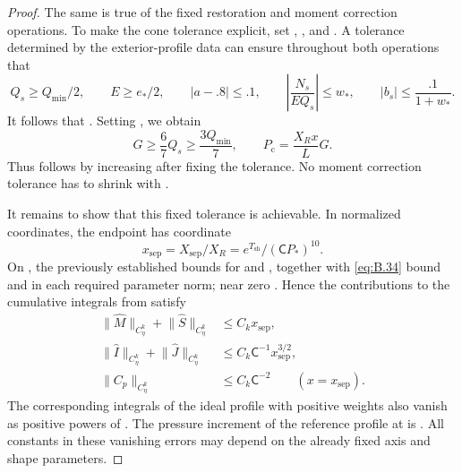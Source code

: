 \begin{proof}
The same is true of the fixed restoration and moment correction operations. To make
the cone tolerance explicit, set
,
, and
. A tolerance determined by the exterior-profile data can ensure
throughout both operations that
\begin{equation}
  Q_s\geq Q_{\min}/2,\qquad
  E\geq e_*/2,\qquad
  |a-.8|\leq.1,\qquad
  \left|\frac{N_s}{EQ_s}\right|\leq w_*,\qquad
  |b_s|\leq\frac{.1}{1+w_*}.
\tag{B.36}\label{eq:B.36}
\end{equation}
It follows that . Setting
, we obtain
\begin{equation}
  G\geq\frac67Q_s\geq\frac{3Q_{\min}}7,
  \qquad
  P_{\mathrm c}=\frac{X_Rx}{L}G.
\tag{B.37}\label{eq:B.37}
\end{equation}
Thus  follows by increasing  after fixing the tolerance. No moment correction
tolerance has to shrink with .

It remains to show that this fixed tolerance is achievable. In normalized coordinates, the
endpoint  has coordinate
\begin{equation}
  x_{\mathrm{sep}}=X_{\mathrm{sep}}/X_R=e^{T_{\mathrm{sh}}}/(\mathsf C P_*)^{10}.
\tag{B.38}\label{eq:B.38}
\end{equation}
On , the previously established bounds for
 and
, together with \eqref{eq:B.34} bound
 and  in each required parameter norm; near zero
. Hence the contributions to the cumulative integrals from
 satisfy
\begin{equation}
\begin{aligned}
  \lVert\widehat M\rVert_{C_\eta^k}+\lVert\widehat S\rVert_{C_\eta^k}
    &\leq C_kx_{\mathrm{sep}},\\
  \lVert\widehat I\rVert_{C_\eta^k}+\lVert\widehat J\rVert_{C_\eta^k}
    &\leq C_k\mathsf C^{-1}x_{\mathrm{sep}}^{3/2},\\
  \lVert C_p\rVert_{C_\eta^k}
    &\leq C_k\mathsf C^{-2}\qquad(x=x_{\mathrm{sep}}).
\end{aligned}
\tag{B.39}\label{eq:B.39}
\end{equation}
The corresponding integrals of the ideal profile with positive weights also vanish as positive
powers of . The pressure increment of the reference profile at
 is
. All constants in these vanishing errors may depend on the already fixed axis and
shape parameters.


\end{proof}
